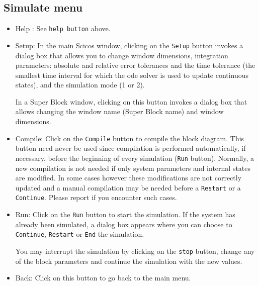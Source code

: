 \subsection{Simulate menu}
\begin{itemize}
\item {Help :} See {\tt help button} above.
\item {Setup:} In the main Scicos window, clicking on the {\tt Setup} button
invokes a dialog box that allows you to change window
dimensions, integration parameters: absolute and
relative error tolerances and the time tolerance
(the smallest time interval for which the ode
solver is used to update continuous states), and
the simulation mode (1 or 2).

In a Super Block window, clicking on this button
invokes a dialog box that allows changing the window
name (Super Block name) and window dimensions.
\item {Compile:} Click on the {\tt Compile} button to compile the
  block diagram.  This button need never be used since compilation is
  performed automatically, if necessary, before the beginning of every
  simulation ({\tt Run} button). Normally, a new compilation is not
  needed if only system parameters and internal states are modified.
  In some cases however these modifications are not correctly updated
  and a manual compilation may be needed before a {\tt Restart} or a
  {\tt Continue}.  Please report if you encounter such cases.
\item {Run:} Click on the {\tt Run} button to start the simulation.  If the
  system has already been simulated, a dialog box appears where you
  can choose to {\tt Continue}, {\tt Restart} or {\tt End} the simulation.

  You may interrupt the simulation by clicking on the {\tt stop} button,
  change any of the block parameters and continue the simulation with
  the new values.
\item {Back:} Click on this button to go back to the main menu.
\end{itemize}

\clearpage


\listoffigures

 

